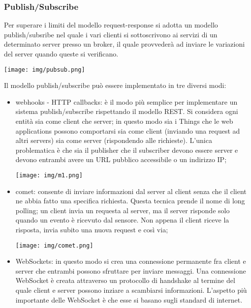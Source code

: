 \documentclass{article}
\begin{document}
\subsubsection{Publish/Subscribe}
Per superare i limiti del modello request-response si adotta un modello publish/subsribe nel quale i vari clienti si sottoscrivono ai servizi di un determinato server presso un broker, il quale provvederà ad inviare le variazioni del server quando queste si verificano. \\
\begin{center}
\texttt{[image: img/pubsub.png]}
\end{center}
Il modello publish/subscribe può essere implementato in tre diversi modi:
\begin{itemize}
\item webhooks - HTTP callbacks: è il modo più semplice per implementare un sistema publish/subscribe rispettando il modello REST. Si considera ogni entità sia come client che server; in questo modo sia i Things che le web applications possono comportarsi sia come client (inviando una request ad altri servers) sia come server (rispondendo alle richieste). L'unica problematica è che sia il publisher che il subscriber devono essere server e devono entrambi avere un URL pubblico accessibile o un indirizzo IP;
\begin{center}
\texttt{[image: img/m1.png]}
\end{center}
\item comet: consente di inviare informazioni dal server al client senza che il client ne abbia fatto una specifica richiesta. Questa tecnica prende il nome di long polling; un client invia un requesta al server, ma il server risponde solo quando un evento è ricevuto dal sensore. Non appena il client riceve la risposta, invia subito una nuova request e così via;
\begin{center}
\texttt{[image: img/comet.png]}
\end{center}
\item WebSockets: in questo modo si crea una connessione permanente fra client e server che entrambi possono sfruttare per inviare messaggi. Una connessione WebSocket è creata attraverso un protocollo di handshake al termine del quale client e server possono inziare a scambiarsi informazioni. L'aspetto più importante delle WebSocket è che esse si basano sugli standard di internet.
\end{itemize}
\end{document}
